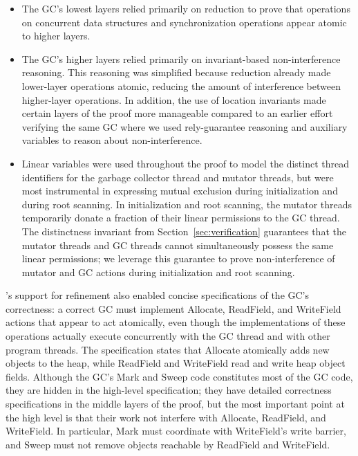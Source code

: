 \begin{itemize}
\item The GC's lowest layers relied primarily on reduction to
prove that operations on
concurrent data structures and synchronization operations appear atomic
to higher layers.

\item The GC's higher layers relied primarily on invariant-based non-interference reasoning.
This reasoning was simplified because reduction already made lower-layer operations atomic,
reducing the amount of interference between higher-layer operations.
In addition, the use of location invariants made certain layers of the proof more
manageable compared to an earlier effort verifying the same GC where we used
rely-guarantee reasoning and auxiliary variables to reason about
non-interference.  

\item Linear variables were used throughout the proof to model the distinct
thread identifiers for the garbage collector thread and mutator
threads, but were most instrumental in expressing mutual exclusion
during initialization and during root scanning.
In initialization and root scanning,
the mutator threads temporarily donate a fraction of their linear permissions to the GC thread.
The distinctness invariant from Section~\ref{sec:verification} guarantees
that the mutator threads and GC threads cannot simultaneously possess the same linear permissions;
we leverage this guarantee to prove non-interference of mutator and GC actions during initialization and root scanning.

\end{itemize}

\civl's support for refinement also enabled concise specifications of the GC's correctness:
a correct GC must implement Allocate, ReadField, and WriteField actions that appear to act atomically,
even though the implementations of these operations actually execute concurrently with the GC thread and with other program threads.
The specification states that Allocate atomically adds new objects to the heap,
while ReadField and WriteField read and write heap object fields.
Although the GC's Mark and Sweep code constitutes most of the GC code,
they are hidden in the high-level specification;
they have detailed correctness specifications in the middle layers of the proof,
but the most important point at the high level is that their work not interfere with Allocate, ReadField, and WriteField.
In particular, Mark must coordinate with WriteField's write barrier,
and Sweep must not remove objects reachable by ReadField and WriteField.

